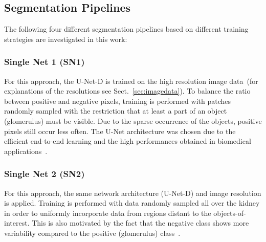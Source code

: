 \documentclass{elsarticle}
\begin{document}
\subsection{Segmentation Pipelines}

%



The following four different segmentation pipelines based on different training strategies are investigated in this work:

\subsubsection{Single Net 1 (SN1)}
	For this approach, the U-Net-D is trained on the high resolution image data~(for explanations of the resolutions see Sect.~\ref{sec:imagedata}). To balance the ratio between positive and negative pixels, training is performed with patches randomly sampled with the restriction that at least a part of an object (glomerulus) must be visible. Due to the sparse occurrence of the objects, positive pixels still occur less often.
	The U-Net architecture was chosen due to the efficient end-to-end learning and the high performances obtained in biomedical applications~\citep{myRonneberger15a}.
\subsubsection{Single Net 2 (SN2)}
	For this approach, the same network architecture (U-Net-D) and image resolution is applied.
	Training is performed with data randomly sampled all over the kidney in order to uniformly incorporate data from regions distant to the objects-of-interest. This is also motivated by the fact that the negative class shows more variability compared to the positive (glomerulus) class~\citep{Gadermayr16f}. %
\end{document}
